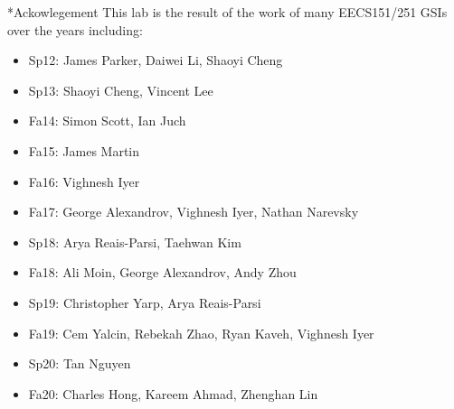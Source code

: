 \documentclass[11pt]{article}
\makeatletter
\renewcommand{\section}
{\@startsection {section}{1}{0pt}
 {-2ex}
 {1ex}
 {\bfseries\Large}}
\makeatother
\begin{document}
\section*{Ackowlegement}
This lab is the result of the work of many EECS151/251 GSIs over the years including:
\begin{itemize}
\item Sp12: James Parker, Daiwei Li, Shaoyi Cheng
\item Sp13: Shaoyi Cheng, Vincent Lee
\item Fa14: Simon Scott, Ian Juch
\item Fa15: James Martin
\item Fa16: Vighnesh Iyer
\item Fa17: George Alexandrov, Vighnesh Iyer, Nathan Narevsky
\item Sp18: Arya Reais-Parsi, Taehwan Kim
\item Fa18: Ali Moin, George Alexandrov, Andy Zhou
\item Sp19: Christopher Yarp, Arya Reais-Parsi
\item Fa19: Cem Yalcin, Rebekah Zhao, Ryan Kaveh, Vighnesh Iyer
\item Sp20: Tan Nguyen
\item Fa20: Charles Hong, Kareem Ahmad, Zhenghan Lin

\end{itemize}
\end{document}
